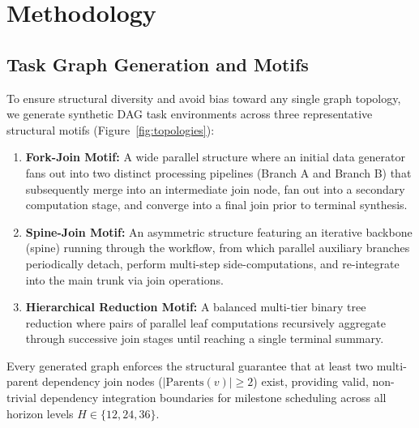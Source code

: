 \section{Methodology}
\label{sec:methodology}

\subsection{Task Graph Generation and Motifs}
To ensure structural diversity and avoid bias toward any single graph topology, we generate synthetic DAG task environments across three representative structural motifs (Figure~\ref{fig:topologies}):
\begin{enumerate}
    \item \textbf{Fork-Join Motif:} A wide parallel structure where an initial data generator fans out into two distinct processing pipelines (Branch A and Branch B) that subsequently merge into an intermediate join node, fan out into a secondary computation stage, and converge into a final join prior to terminal synthesis.
    \item \textbf{Spine-Join Motif:} An asymmetric structure featuring an iterative backbone (spine) running through the workflow, from which parallel auxiliary branches periodically detach, perform multi-step side-computations, and re-integrate into the main trunk via join operations.
    \item \textbf{Hierarchical Reduction Motif:} A balanced multi-tier binary tree reduction where pairs of parallel leaf computations recursively aggregate through successive join stages until reaching a single terminal summary.
\end{enumerate}

Every generated graph enforces the structural guarantee that at least two multi-parent dependency join nodes ($|\text{Parents}(v)| \ge 2$) exist, providing valid, non-trivial dependency integration boundaries for milestone scheduling across all horizon levels $H \in \{12, 24, 36\}$.


